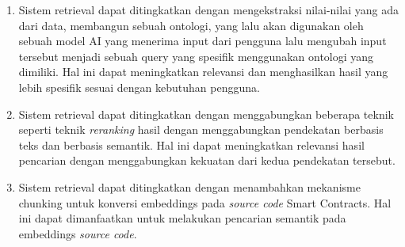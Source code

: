\begin{enumerate}
    \item Sistem retrieval dapat ditingkatkan dengan mengekstraksi nilai-nilai yang ada dari data, membangun sebuah ontologi, yang lalu akan digunakan oleh sebuah model AI yang menerima input dari pengguna lalu mengubah input tersebut menjadi sebuah query yang spesifik menggunakan ontologi yang dimiliki. Hal ini dapat meningkatkan relevansi dan menghasilkan hasil yang lebih spesifik sesuai dengan kebutuhan pengguna.
    \item Sistem retrieval dapat ditingkatkan dengan menggabungkan beberapa teknik seperti teknik \textit{reranking} hasil dengan menggabungkan pendekatan berbasis teks dan berbasis semantik. Hal ini dapat meningkatkan relevansi hasil pencarian dengan menggabungkan kekuatan dari kedua pendekatan tersebut.
    \item Sistem retrieval dapat ditingkatkan dengan menambahkan mekanisme chunking untuk konversi embeddings pada \textit{source code} Smart Contracts. Hal ini dapat dimanfaatkan untuk melakukan pencarian semantik pada embeddings \textit{source code}.
\end{enumerate}

